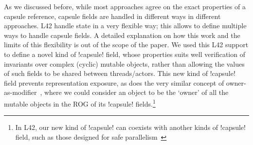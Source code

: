 

As we discussed before, while most approaches agree on the exact properties of a capsule reference,
capsule fields are handled in different ways in different approaches. L42 handle state in a very flexible way; this allows to define multiple ways to handle capsule fields. A detailed explanation on how this work and the limits of this flexibility is out of the scope of the paper.
We used this L42 support to define a novel kind of \Q!capsule! field,
whose properties suits well verification of invariants over complex (cyclic) mutable objects,
rather than allowing the values of such fields to be shared between threads/actors.
This new kind of \Q!capsule! field prevents representation exposure, as does the very similar concept of owner-as-modifier~\cite{Dietl05universes:lightweight,10.1007/978-3-540-92188-2_4}, where we could consider an object to be the `owner' of all the mutable objects in the ROG of its \Q!capsule! fields.\footnote{In L42, our new kind of \Q!capsule! can coexists with another kinds of \Q!capsule! field, such as those designed for safe parallelism~\cite{GordonEtAl12,clebsch2015deny,GIANNINI2019145}}





